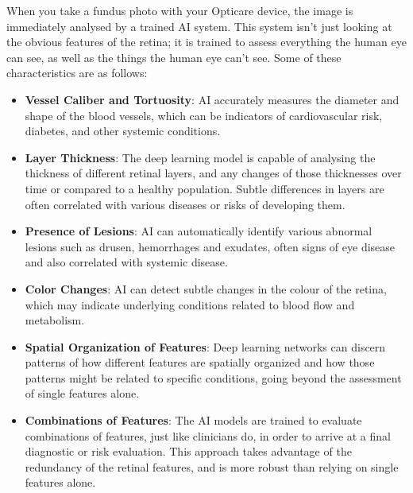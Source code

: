 \documentclass[
  Letterpaper,
]{scrbook}
\begin{document}
When you take a fundus photo with your Opticare device, the image is
immediately analysed by a trained AI system. This system isn't just
looking at the obvious features of the retina; it is trained to assess
everything the human eye can see, as well as the things the human eye
can't see. Some of these characteristics are as follows:

\begin{itemize}
\item
  \textbf{Vessel Caliber and Tortuosity}: AI accurately measures the
  diameter and shape of the blood vessels, which can be indicators of
  cardiovascular risk, diabetes, and other systemic conditions.
\item
  \textbf{Layer Thickness}: The deep learning model is capable of
  analysing the thickness of different retinal layers, and any changes
  of those thicknesses over time or compared to a healthy population.
  Subtle differences in layers are often correlated with various
  diseases or risks of developing them.
\item
  \textbf{Presence of Lesions}: AI can automatically identify various
  abnormal lesions such as drusen, hemorrhages and exudates, often signs
  of eye disease and also correlated with systemic disease.
\item
  \textbf{Color Changes}: AI can detect subtle changes in the colour of
  the retina, which may indicate underlying conditions related to blood
  flow and metabolism.
\item
  \textbf{Spatial Organization of Features}: Deep learning networks can
  discern patterns of how different features are spatially organized and
  how those patterns might be related to specific conditions, going
  beyond the assessment of single features alone.
\item
  \textbf{Combinations of Features}: The AI models are trained to
  evaluate combinations of features, just like clinicians do, in order
  to arrive at a final diagnostic or risk evaluation. This approach
  takes advantage of the redundancy of the retinal features, and is more
  robust than relying on single features alone.
\end{itemize}
\end{document}

